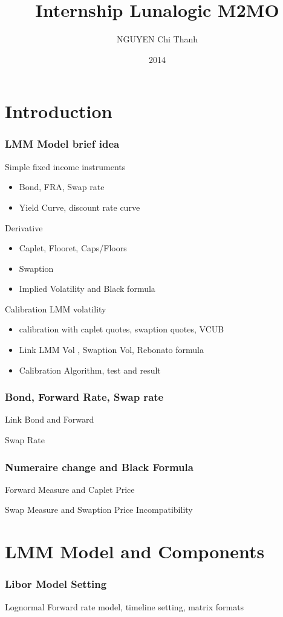 \documentclass[8pt]{beamer}
\title[Off-Cycle internship]{Internship Lunalogic M2MO}
\author[Chi Thanh NGUYEN]{NGUYEN Chi Thanh}
\institute[Lunalogic - M2MO]{Lunalogic and M2MO}
\date{2014}
\begin{document}
\begin{frame}[plain]
\titlepage
\end{frame}

\begin{frame}
\tableofcontents
\end{frame}

\section{Introduction}
\begin{frame}
\frametitle{LMM Model brief idea}
Simple fixed income instruments 
\begin{itemize}
	\item  Bond, FRA, Swap rate
	\item Yield Curve, discount rate curve
\end{itemize}
Derivative
\begin{itemize}
	\item Caplet, Flooret, Caps/Floors
	\item Swaption
	\item Implied Volatility and Black formula
\end{itemize}
Calibration LMM volatility
\begin{itemize}
	\item calibration with caplet quotes, swaption quotes, VCUB
	\item Link LMM Vol , Swaption Vol, Rebonato formula
	\item Calibration Algorithm, test and result
\end{itemize}
\end{frame}


\begin{frame}
\frametitle{Bond, Forward Rate, Swap rate}
Link Bond and Forward

Swap Rate
\end{frame}

\begin{frame}
\frametitle{Numeraire change and Black Formula}
Forward Measure and Caplet Price

Swap Measure and Swaption Price
Incompatibility
\end{frame}

\section{LMM Model and Components}
\begin{frame}
\frametitle{Libor Model Setting}
Lognormal Forward rate model, 
timeline setting, 
matrix formats
\end{frame}
\end{document}

